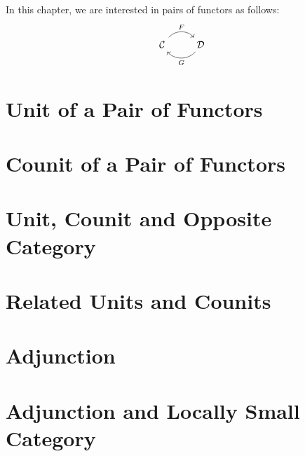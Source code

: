 In this chapter, we are interested in pairs of functors as follows:
    \[
        \begin{tikzcd}
              \Cat \arrow[r, "F", bend left  = 50, ""{name=U, below}]
            & \Dat \arrow[l, "G", bend left = 50, ""{name=D, above}]
        \end{tikzcd}
    \]
\section{Unit of a Pair of Functors}
    
\section{Counit of a Pair of Functors}
    
\section{Unit, Counit and Opposite Category}
    
\section{Related Units and Counits}
    
\section{Adjunction}
    
\section{Adjunction and Locally Small Category} 
    
